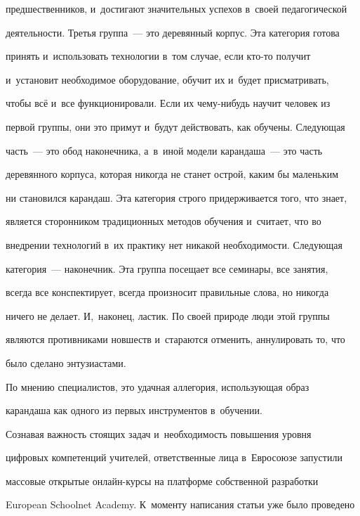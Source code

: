 предшественников, и~достигают значительных успехов в~своей педагогической 


деятельности. Третья группа~--- это деревянный корпус. Эта категория готова 


принять и~использовать технологии в~том случае, если кто-то получит 


и~установит необходимое оборудование, обучит их и~будет присматривать, 


чтобы всё и~все функционировали. Если их че\-му-ни\-будь научит человек из 


первой группы, они это примут и~будут действовать, как обучены. Следующая 


часть~--- это обод наконечника, а~в~иной модели карандаша~--- это часть 


деревянного корпуса, которая никогда не станет острой, каким бы маленьким 


ни становился карандаш. Эта категория строго придерживается того, что знает, 


является сторонником традиционных методов обучения и~считает, что во 


внедрении технологий в~их практику нет никакой необходимости. Следующая 


категория~--- наконечник. Эта группа посещает все семинары, все занятия, 


всегда все конспектирует, всегда произносит правильные слова, но никогда 


ничего не делает. И,~наконец, ластик. По своей природе люди этой группы 


являются противниками новшеств и~стараются отменить, аннулировать то, что 


было сделано энтузиастами. 


  


  По мнению специалистов, это удачная аллегория, использующая образ 


карандаша как одного из первых инструментов в~обучении. 


  


  Сознавая важность стоящих задач и~необходимость повышения уровня 


циф\-ро\-вых компетенций учителей, ответственные лица в~Евросоюзе запустили 


массовые открытые он\-лайн-кур\-сы на платформе собственной разработки 


European Schoolnet Academy. К~моменту написания статьи уже было проведено 



